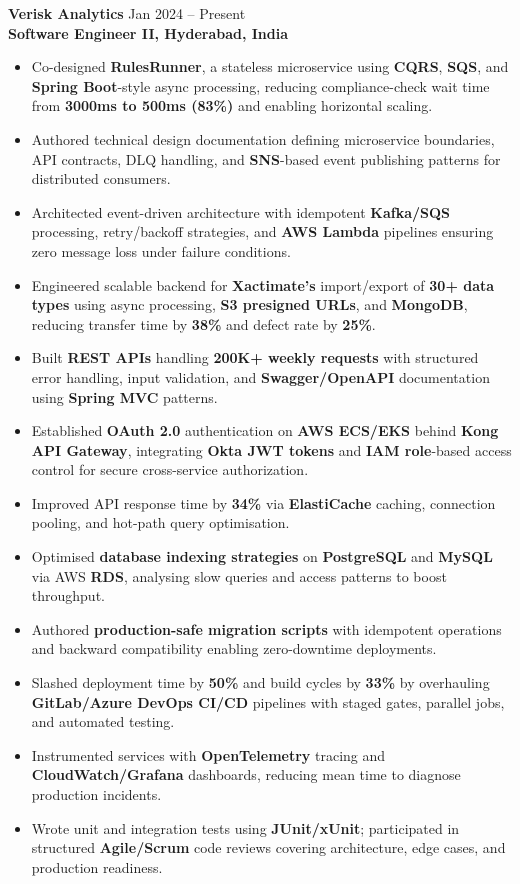 \documentclass[a4paper,10pt]{article}
\begin{document}
\textbf{Verisk Analytics} \hfill Jan 2024 -- Present \\
\textbf{Software Engineer II, Hyderabad, India}

\begin{itemize}[leftmargin=*]
    \item Co-designed \textbf{RulesRunner}, a stateless microservice using \textbf{CQRS}, \textbf{SQS}, and \textbf{Spring Boot}-style async processing, reducing compliance-check wait time from \textbf{3000ms to 500ms (83\%)} and enabling horizontal scaling.
    \item Authored technical design documentation defining microservice boundaries, API contracts, DLQ handling, and \textbf{SNS}-based event publishing patterns for distributed consumers.
    \item Architected event-driven architecture with idempotent \textbf{Kafka/SQS} processing, retry/backoff strategies, and \textbf{AWS Lambda} pipelines ensuring zero message loss under failure conditions.
    \item Engineered scalable backend for \textbf{Xactimate's} import/export of \textbf{30+ data types} using async processing, \textbf{S3 presigned URLs}, and \textbf{MongoDB}, reducing transfer time by \textbf{38\%} and defect rate by \textbf{25\%}.
    \item Built \textbf{REST APIs} handling \textbf{200K+ weekly requests} with structured error handling, input validation, and \textbf{Swagger/OpenAPI} documentation using \textbf{Spring MVC} patterns.
    \item Established \textbf{OAuth 2.0} authentication on \textbf{AWS ECS/EKS} behind \textbf{Kong API Gateway}, integrating \textbf{Okta JWT tokens} and \textbf{IAM role}-based access control for secure cross-service authorization.
    \item Improved API response time by \textbf{34\%} via \textbf{ElastiCache} caching, connection pooling, and hot-path query optimisation.
    \item Optimised \textbf{database indexing strategies} on \textbf{PostgreSQL} and \textbf{MySQL} via AWS \textbf{RDS}, analysing slow queries and access patterns to boost throughput.
    \item Authored \textbf{production-safe migration scripts} with idempotent operations and backward compatibility enabling zero-downtime deployments.
    \item Slashed deployment time by \textbf{50\%} and build cycles by \textbf{33\%} by overhauling \textbf{GitLab/Azure DevOps CI/CD} pipelines with staged gates, parallel jobs, and automated testing.
    \item Instrumented services with \textbf{OpenTelemetry} tracing and \textbf{CloudWatch/Grafana} dashboards, reducing mean time to diagnose production incidents.
    \item Wrote unit and integration tests using \textbf{JUnit/xUnit}; participated in structured \textbf{Agile/Scrum} code reviews covering architecture, edge cases, and production readiness.
\end{itemize}
\end{document}
